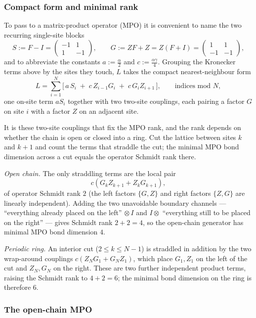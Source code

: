 \documentclass[12pt]{article}
\theoremstyle{definition}
\theoremstyle{remark}
\begin{document}
\subsubsection{Compact form and minimal rank}

To pass to a matrix-product operator (MPO) it is convenient to name the two recurring single-site blocks
\[
S := F - I =
\begin{pmatrix} -1 & 1 \\ 1 & -1 \end{pmatrix},
\qquad
G := ZF + Z = Z(F+I) =
\begin{pmatrix} 1 & 1 \\ -1 & -1 \end{pmatrix},
\]
and to abbreviate the constants $a := \tfrac{\alpha}{2}$ and $c := \tfrac{\alpha\gamma}{4}$. Grouping the Kronecker terms above by the sites they touch, $L$ takes the compact nearest-neighbour form
\[
L = \sum_{i=1}^N \Big[\, a\, S_i \;+\; c\, Z_{i-1} G_i \;+\; c\, G_i Z_{i+1} \,\Big],
\qquad \text{indices mod } N,
\]
one on-site term $a S_i$ together with two two-site couplings, each pairing a factor $G$ on site $i$ with a factor $Z$ on an adjacent site.

It is these two-site couplings that fix the MPO rank, and the rank depends on whether the chain is open or closed into a ring. Cut the lattice between sites $k$ and $k+1$ and count the terms that straddle the cut; the minimal MPO bond dimension across a cut equals the operator Schmidt rank there.

\emph{Open chain.} The only straddling terms are the local pair
\[
c\left( G_k Z_{k+1} + Z_k G_{k+1} \right),
\]
of operator Schmidt rank $2$ (the left factors $\{G, Z\}$ and right factors $\{Z, G\}$ are linearly independent). Adding the two unavoidable boundary channels --- ``everything already placed on the left'' $\otimes\, I$ and $I \otimes$ ``everything still to be placed on the right'' --- gives Schmidt rank $2 + 2 = 4$, so the open-chain generator has minimal MPO bond dimension $4$.

\emph{Periodic ring.} An interior cut ($2 \le k \le N-1$) is straddled in addition by the two wrap-around couplings $c(Z_N G_1 + G_N Z_1)$, which place $G_1, Z_1$ on the left of the cut and $Z_N, G_N$ on the right. These are two further independent product terms, raising the Schmidt rank to $4 + 2 = 6$; the minimal bond dimension on the ring is therefore $6$.
\subsubsection{The open-chain MPO}
\end{document}
